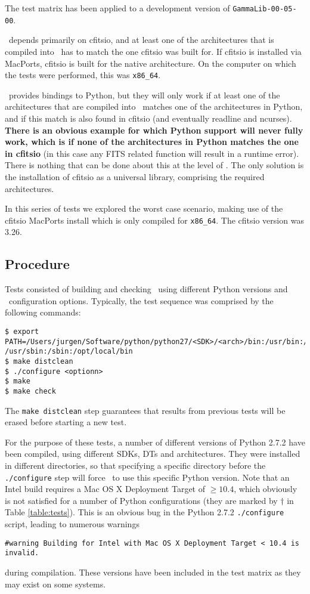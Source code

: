 \documentclass{article}[12pt,a4]
\begin{document}
The test matrix has been applied to a development version of {\tt GammaLib-00-05-00}.

\this\ depends primarily on cfitsio, and at least one of the architectures that is compiled into \this\
has to match the one cfitsio was built for.
If cfitsio is installed via MacPorts, cfitsio is built for the native architecture.
On the computer on which the tests were performed, this was {\tt x86\_64}.

\this\ provides bindings to Python, but they will only work if at least one of the architectures that 
are compiled into \this\ matches one of the architectures in Python, and if this match is also found
in cfitsio (and eventually readline and ncurses).
{\bf There is an obvious example for which Python support will never fully work, which is if none 
of the architectures in Python matches the one in cfitsio} (in this case any FITS related function
will result in a runtime error).
There is nothing that can be done about this at the level of \this.
The only solution is the installation of cfitsio as a universal library, comprising the required
architectures.

In this series of tests we explored the worst case scenario, making use of the cfitsio MacPorts
install which is only compiled for {\tt x86\_64}.
The cfitsio version was 3.26.


\subsection{Procedure}

Tests consisted of building and checking \this\ using different Python versions and \this\
configuration options.
Typically, the test sequence was comprised by the following commands:
\begin{verbatim}
$ export PATH=/Users/jurgen/Software/python/python27/<SDK>/<arch>/bin:/usr/bin:/bin:
/usr/sbin:/sbin:/opt/local/bin
$ make distclean
$ ./configure <optionn>
$ make
$ make check
\end{verbatim}

The {\tt make distclean} step guarantees that results from previous tests will be erased before
starting a new test.

For the purpose of these tests, a number of different versions of Python 2.7.2 have been compiled,
using different SDKs, DTs and architectures.
They were installed in different directories, so that specifying a specific directory before the
{\tt ./configure} step will force \this\ to use this specific Python version.
Note that an Intel build requires a Mac OS X Deployment Target of $\ge10.4$, which obviously
is not satisfied for a number of Python configurations (they are marked by $\dag$ in 
Table \ref{table:tests}).
This is an obvious bug in the Python 2.7.2 {\tt ./configure} script, leading to numerous
warnings
\begin{verbatim}
#warning Building for Intel with Mac OS X Deployment Target < 10.4 is invalid.
\end{verbatim}
during compilation.
These versions have been included in the test matrix as they may exist on some systems.
\end{document}
